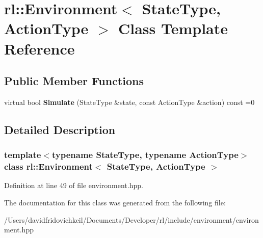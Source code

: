 \hypertarget{classrl_1_1_environment}{}\section{rl\+:\+:Environment$<$ State\+Type, Action\+Type $>$ Class Template Reference}
\label{classrl_1_1_environment}
\subsection*{Public Member Functions}
\begin{DoxyCompactItemize}
\item 
\hypertarget{classrl_1_1_environment_a90156f379bc94638e87614b1fcb45329}{}\label{classrl_1_1_environment_a90156f379bc94638e87614b1fcb45329} 
virtual bool {\bfseries Simulate} (State\+Type \&state, const Action\+Type \&action) const =0
\end{DoxyCompactItemize}


\subsection{Detailed Description}
\subsubsection*{template$<$typename State\+Type, typename Action\+Type$>$\newline
class rl\+::\+Environment$<$ State\+Type, Action\+Type $>$}



Definition at line 49 of file environment.\+hpp.



The documentation for this class was generated from the following file\+:\begin{DoxyCompactItemize}
\item 
/\+Users/davidfridovichkeil/\+Documents/\+Developer/rl/include/environment/environment.\+hpp\end{DoxyCompactItemize}
